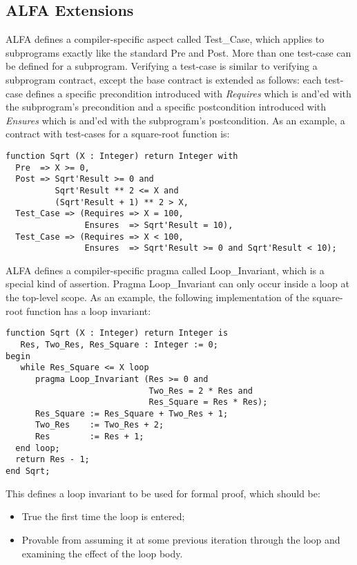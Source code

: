 \documentclass{article}
\begin{document}
\subsection{ALFA Extensions}

ALFA defines a compiler-specific aspect called Test\_Case, which applies to
subprograms exactly like the standard Pre and Post. More than one test-case can
be defined for a subprogram. Verifying a test-case is similar to verifying a
subprogram contract, except the base contract is extended as follows: each
test-case defines a specific precondition introduced with \textit{Requires}
which is and'ed with the subprogram's precondition and a specific postcondition
introduced with \textit{Ensures} which is and'ed with the subprogram's
postcondition. As an example, a contract with test-cases for a square-root
function is:

\begin{verbatim}
function Sqrt (X : Integer) return Integer with
  Pre  => X >= 0,
  Post => Sqrt'Result >= 0 and 
          Sqrt'Result ** 2 <= X and
          (Sqrt'Result + 1) ** 2 > X,
  Test_Case => (Requires => X = 100, 
                Ensures  => Sqrt'Result = 10),
  Test_Case => (Requires => X < 100, 
                Ensures  => Sqrt'Result >= 0 and Sqrt'Result < 10);
\end{verbatim}

ALFA defines a compiler-specific pragma called Loop\_Invariant, which is a
special kind of assertion. Pragma Loop\_Invariant can only occur inside a
loop at the top-level scope. As an example, the following implementation of the
square-root function has a loop invariant:

\begin{verbatim}
function Sqrt (X : Integer) return Integer is
   Res, Two_Res, Res_Square : Integer := 0;
begin
   while Res_Square <= X loop
      pragma Loop_Invariant (Res >= 0 and
                             Two_Res = 2 * Res and
                             Res_Square = Res * Res);
      Res_Square := Res_Square + Two_Res + 1;
      Two_Res    := Two_Res + 2;
      Res        := Res + 1;
  end loop;
  return Res - 1;
end Sqrt;
\end{verbatim}

This defines a loop invariant to be used for formal proof, which should be:
\begin{itemize}
\item True the first time the loop is entered;
\item Provable from assuming it at some previous iteration through the loop and
  examining the effect of the loop body.
\end{itemize}
\end{document}
